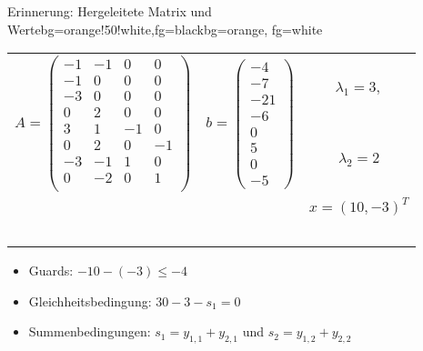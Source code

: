 \begin{frame}
	\begin{variableblock}{Erinnerung: Hergeleitete Matrix und Werte}{bg=orange!50!white,fg=black}{bg=orange, fg=white}
		\begin{tabular}{llc}
			\multirow{2}{*}{$A=\begin{pmatrix}
				-1 		& -1 		&  0		& 0		 \\
				-1 		& 0 		&  0		& 0		 \\
				-3 		& 0 		&  0		& 0		 \\
				0 		& 2 		&  0		& 0		 \\
				3 		& 1 		&  -1		& 0		 \\
				0 		& 2 		&  0		& -1	 \\
				-3 		& -1 		&  1		& 0		 \\
				0 		& -2 		&  0		& 1	 	 \\
				\end{pmatrix}$}&\multirow{2}{*}{$ b=\begin{pmatrix}
				-4 \\ -7 \\ -21 \\ -6 \\ 0 \\ 5 \\ 0 \\ -5
				\end{pmatrix} $}& $\lambda_1 = 3,$ \\
			& &  $\lambda_2 = 2$\\
			& & $x=(10, -3)^T$ \\
			& & \\
			& & \\
			& & \\
			& & \\
			& & \\
		\end{tabular}
	\end{variableblock}
	\begin{example}
		\begin{itemize}
			\item Guards: $-10-(-3)\le-4$
			\item Gleichheitsbedingung: $30-3-s_1=0$
			\item Summenbedingungen: $s_1= y_{1,1}+y_{2,1}$ und $s_2=y_{1,2}+y_{2,2}$
		\end{itemize}
	\end{example}	
\end{frame}


